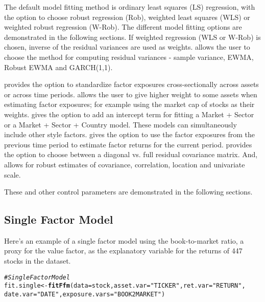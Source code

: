 \documentclass[a4paper]{article}\usepackage[]{graphicx}\usepackage[]{color}
\makeatletter
\newcommand{\hlstr}[1]{\textcolor[rgb]{0.192,0.494,0.8}{#1}}%
\newcommand{\hlcom}[1]{\textcolor[rgb]{0.678,0.584,0.686}{\textit{#1}}}%
\newcommand{\hlstd}[1]{\textcolor[rgb]{0.345,0.345,0.345}{#1}}%
\newcommand{\hlkwb}[1]{\textcolor[rgb]{0.69,0.353,0.396}{#1}}%
\newcommand{\hlkwc}[1]{\textcolor[rgb]{0.333,0.667,0.333}{#1}}%
\newcommand{\hlkwd}[1]{\textcolor[rgb]{0.737,0.353,0.396}{\textbf{#1}}}%
\newenvironment{kframe}{%
 \def\at@end@of@kframe{}%
 \ifinner\ifhmode%
  \def\at@end@of@kframe{\end{minipage}}%
  \begin{minipage}{\columnwidth}%
 \fi\fi%
 \def\FrameCommand##1{\hskip\@totalleftmargin \hskip-\fboxsep
 \colorbox{shadecolor}{##1}\hskip-\fboxsep
     \hskip-\linewidth \hskip-\@totalleftmargin \hskip\columnwidth}%
 \MakeFramed {\advance\hsize-\width
   \@totalleftmargin\z@ \linewidth\hsize
   \@setminipage}}%
 {\par\unskip\endMakeFramed%
 \at@end@of@kframe}
\newenvironment{knitrout}{}{} %
\makeatother
\begin{document}
The default model fitting method is ordinary least squares (LS) regression, with the option to choose robust regression (Rob), weighted least squares (WLS) or weighted robust regression (W-Rob). The different model fitting options are demonstrated in the following sections. If weighted regression (WLS or W-Rob) is chosen, inverse of the residual variances are used as weights.  allows the user to choose the method for computing residual variances - sample variance, EWMA, Robust EWMA and GARCH(1,1).

 provides the option to standardize factor exposures cross-sectionally across assets or across time periods.  allows the user to give higher weight to some assets when estimating factor exposures; for example using the market cap of stocks as their weights.  gives the option to add an intercept term for fitting a Market + Sector or a Market + Sector + Country model. These models can simultaneously include other style factors.  gives the option to use the factor exposures from the previous time period to estimate factor returns for the current period.  provides the option to choose between a diagonal vs. full residual covariance matrix. And,  allows for robust estimates of covariance, correlation, location and univariate scale.

These and other control parameters are demonstrated in the following sections.

\subsection{Single Factor Model}

Here's an example of a single factor model using the book-to-market ratio, a proxy for the value factor, as the explanatory variable for the returns of 447 stocks in the dataset.

\begin{knitrout}
\color{fgcolor}\begin{kframe}
\begin{alltt}
\hlcom{# Single Factor Model}
\hlstd{fit.single} \hlkwb{<-} \hlkwd{fitFfm}\hlstd{(}\hlkwc{data}\hlstd{=stock,} \hlkwc{asset.var}\hlstd{=}\hlstr{"TICKER"}\hlstd{,} \hlkwc{ret.var}\hlstd{=}\hlstr{"RETURN"}\hlstd{,}
                     \hlkwc{date.var}\hlstd{=}\hlstr{"DATE"}\hlstd{,} \hlkwc{exposure.vars}\hlstd{=}\hlstr{"BOOK2MARKET"}\hlstd{)}
\end{alltt}


{\ttfamily\noindent\bfseries\color{errorcolor}{\#\# Error in `rownames<-`(`*tmp*`, value = factor.names): attempt to set 'rownames' on an object with no dimensions}}\end{kframe}
\end{knitrout}
\end{document}
